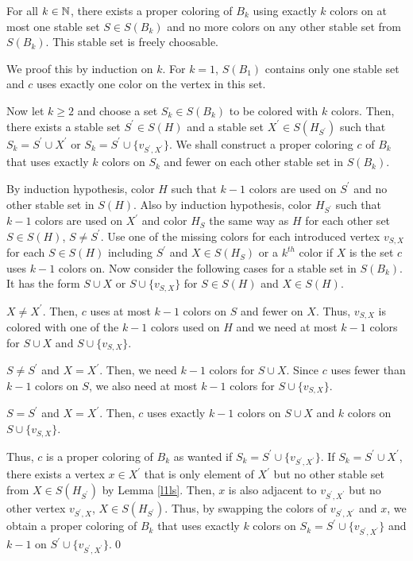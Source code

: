 \begin{thm}
For all $k\in\mathbb{N}$, there exists a proper coloring of $B_k$ using exactly $k$ colors on at most one stable set $S\in S(B_k)$ and no more colors on any other stable set from $S(B_k)$. This stable set is freely choosable.
\end{thm}
\begin{prf}
We proof this by induction on $k$. For $k=1$, $S(B_1)$ contains only one stable set and $c$ uses exactly one color on the vertex in this set. 

Now let $k\geq 2$ and choose a set $S_k\in S(B_k)$ to be colored with $k$ colors.  Then, there exists a stable set $S^\prime\in S(H)$ and a stable set $X^\prime\in S(H_{S^\prime})$ such that $S_k=S^\prime\cup X^\prime$ or $S_k=S^\prime\cup \{v_{S^\prime ,X^\prime}\}$. We shall construct a proper coloring $c$ of $B_k$ that uses exactly $k$ colors on $S_k$ and fewer on each other stable set in $S(B_k)$. 

By induction hypothesis, color $H$ such that $k-1$ colors are used on $S^\prime$ and no other stable set in $S(H)$. Also by induction hypothesis, color $H_{S^\prime}$ such that $k-1$ colors are used on $X^\prime$ and color $H_S$ the same way as $H$ for each other set $S\in S(H)$, $S\neq S^\prime$. Use one of the missing colors for each introduced vertex $v_{S,X}$ for each $S\in S(H)$ including $S^\prime$ and $X\in S(H_S)$ or a $k^{th}$ color if $X$ is the set $c$ uses $k-1$ colors on. Now consider the following cases for a stable set in $S(B_k)$. It has the form $S\cup X$ or $S\cup \{v_{S,X}\}$ for $S\in S(H)$ and $X\in S(H)$.
\begin{case}
$X\neq X^\prime$. Then, $c$ uses at most $k-1$ colors on $S$ and fewer on $X$. Thus, $v_{S,X}$ is colored with one of the $k-1$ colors used on $H$ and we need at most $k-1$ colors for $S\cup X$ and $S\cup \{ v_{S,X}\}$.
\end{case}
\begin{case}
$S\neq S^\prime$ and $X= X^\prime$. Then, we need $k-1$ colors for $S\cup X$. Since $c$ uses fewer than $k-1$ colors on $S$, we also need at most $k-1$ colors for $S\cup \{ v_{S,X}\}$.
\end{case}
\begin{case}
$S=S^\prime$ and $X=X^\prime$. Then, $c$ uses exactly $k-1$ colors on $S\cup X$ and $k$ colors on $S\cup \{ v_{S,X}\}$.
\end{case}
Thus, $c$ is a proper coloring of $B_k$ as wanted if $S_k=S^\prime\cup \{v_{S^\prime ,X^\prime}\}$. If $S_k=S^\prime\cup X^\prime$, there exists a vertex $x\in X^\prime$ that is only element of $X^\prime$ but no other stable set from $X\in S(H_{S^\prime})$ by Lemma \ref{l1ls}. Then, $x$ is also adjacent to $v_{S^\prime, X^\prime}$ but no other vertex $v_{S^\prime, X}$, $X\in S(H_{S^\prime})$. Thus, by swapping the colors of $v_{S^\prime, X^\prime}$ and $x$, we obtain a proper coloring of $B_k$ that uses exactly $k$ colors on $S_k=S^\prime\cup \{v_{S^\prime ,X^\prime}\}$ and $k-1$ on $S^\prime\cup \{v_{S^\prime ,X^\prime}\}$.\qed
\end{prf}

